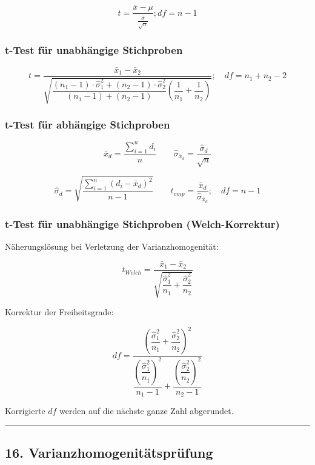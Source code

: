 \documentclass[
]{article}
\begin{document}
\[t = \frac{\bar{x} - \mu}{\frac{\hat{\sigma}}{\sqrt{n}}} ; df = n-1\]

\subsubsection{t-Test für unabhängige
Stichproben}\label{t-test-fuxfcr-unabhuxe4ngige-stichproben}

\[t = \frac{\bar{x}_1 - \bar{x}_2}{\sqrt{\dfrac{(n_1 - 1) \cdot \hat{\sigma}_1^2 + (n_2 - 1) \cdot \hat{\sigma}_2^2}{(n_1 - 1) + (n_2 - 1)} \left(\dfrac{1}{n_1} + \dfrac{1}{n_2}\right)}}; \quad df = n_1 + n_2 - 2\]

\subsubsection{t-Test für abhängige
Stichproben}\label{t-test-fuxfcr-abhuxe4ngige-stichproben}

\[\bar{x}_d = \frac{\sum_{i=1}^{n} d_i}{n} \qquad \hat{\sigma}_{\bar{x}_d} = \frac{\hat{\sigma}_d}{\sqrt{n}}\]

\[\hat{\sigma}_d = \sqrt{\frac{\sum_{i=1}^{n}(d_i - \bar{x}_d)^2}{n - 1}} \qquad t_{emp} = \frac{\bar{x}_d}{\hat{\sigma}_{\bar{x}_d}}; \quad df = n - 1\]

\subsubsection{t-Test für unabhängige Stichproben
(Welch-Korrektur)}\label{t-test-fuxfcr-unabhuxe4ngige-stichproben-welch-korrektur}

Näherungslösung bei Verletzung der Varianzhomogenität:

\[t_{Welch} = \frac{\bar{x}_1 - \bar{x}_2}{\sqrt{\dfrac{\hat{\sigma}_1^2}{n_1} + \dfrac{\hat{\sigma}_2^2}{n_2}}}\]

Korrektur der Freiheitsgrade:

\[df = \frac{\left(\dfrac{\hat{\sigma}_1^2}{n_1} + \dfrac{\hat{\sigma}_2^2}{n_2}\right)^2}{\dfrac{\left(\dfrac{\hat{\sigma}_1^2}{n_1}\right)^2}{n_1 - 1} + \dfrac{\left(\dfrac{\hat{\sigma}_2^2}{n_2}\right)^2}{n_2 - 1}}\]

Korrigierte \(df\) werden auf die nächste ganze Zahl abgerundet.

\begin{center}\rule{0.5\linewidth}{0.5pt}\end{center}

\subsection{16.
Varianzhomogenitätsprüfung}\label{varianzhomogenituxe4tspruxfcfung}
\end{document}
